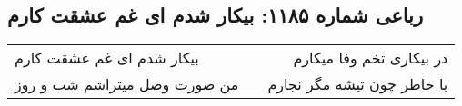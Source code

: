 \begin{center}
\section*{رباعی شماره ۱۱۸۵: بیکار شدم ای غم عشقت کارم}
\label{sec:1185}
\begin{longtable}{l p{0.5cm} r}
بیکار شدم ای غم عشقت کارم
&&
در بیکاری تخم وفا میکارم
\\
من صورت وصل میتراشم شب و روز
&&
با خاطر چون تیشه مگر نجارم
\\
\end{longtable}
\end{center}
